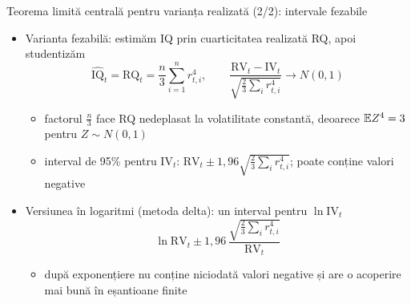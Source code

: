 \begin{frame}{Teorema limită centrală pentru varianța realizată (2/2): intervale fezabile}
\itemsize{\small}
\begin{itemize}
    \item Varianta fezabilă: estimăm IQ prin cuarticitatea realizată RQ, apoi studentizăm
    \[ \widehat{\mathrm{IQ}}_t = \mathrm{RQ}_t = \frac n3\sum_{i=1}^n r_{t,i}^4, \qquad \frac{\mathrm{RV}_t - \mathrm{IV}_t}{\sqrt{\frac23\sum_i r_{t,i}^4}} \to N(0, 1) \]
    \begin{itemize}
        \item factorul $\frac n3$ face RQ nedeplasat la volatilitate constantă, deoarece $\mathbb{E} Z^4 = 3$ pentru $Z \sim N(0, 1)$
        \item interval de 95\% pentru $\mathrm{IV}_t$: $\mathrm{RV}_t \pm 1{,}96\sqrt{\frac23\sum_i r_{t,i}^4}$; poate conține valori negative
    \end{itemize}
    \item Versiunea în logaritmi (metoda delta): un interval pentru $\ln\mathrm{IV}_t$
    \[ \ln\mathrm{RV}_t \pm 1{,}96\,\frac{\sqrt{\frac23\sum_i r_{t,i}^4}}{\mathrm{RV}_t} \]
    \begin{itemize}
        \item după exponențiere nu conține niciodată valori negative și are o acoperire mai bună în eșantioane finite
    \end{itemize}
\end{itemize}
\end{frame}

